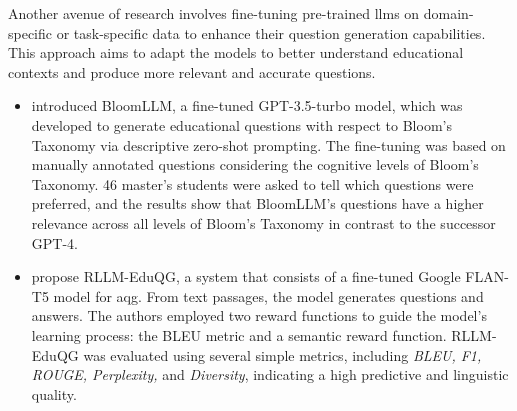  Another avenue of research involves fine-tuning pre-trained \ac{llms} on domain-specific or task-specific data to enhance their question generation capabilities. This approach aims to adapt the models to better understand educational contexts and produce more relevant and accurate questions.
\begin{itemize}
    \item \cite{duong-trung_bloomllm_2024} introduced BloomLLM, a fine-tuned GPT-3.5-turbo model, which was developed to generate educational questions with respect to Bloom's Taxonomy via descriptive zero-shot prompting. The fine-tuning was based on manually annotated questions considering the cognitive levels of Bloom's Taxonomy. 46 master's students were asked to tell which questions were preferred, and the results show that BloomLLM's questions have a higher relevance across all levels of Bloom's Taxonomy in contrast to the successor GPT-4.
    \item \cite{lamsiyah_fine-tuning_2024} propose RLLM-EduQG, a system that consists of a fine-tuned Google FLAN-T5 model for \ac{aqg}. From text passages, the model generates questions and answers. The authors employed two reward functions to guide the model's learning process: the BLEU metric and a semantic reward function. RLLM-EduQG was evaluated using several simple metrics, including \textit{BLEU, F1, ROUGE, Perplexity,} and \textit{Diversity}, indicating a high predictive and linguistic quality.
\end{itemize}

